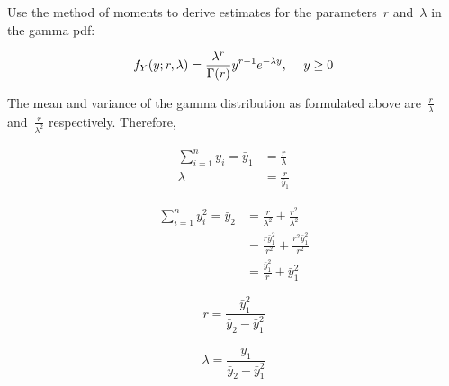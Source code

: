 \begin{problem}
   Use the method of moments to derive estimates for the parameters~$r$ and~$\lambda$ in the gamma pdf:

  \begin{equation}
    f_{Y}(y;r,\lambda) = \frac{\lambda^{r}}{\Gamma(r)} y^{r-1} e^{-\lambda y}\text{,} \hspace{0.5cm}y \geq 0
  \end{equation}
\end{problem}


The mean and variance of the gamma distribution as formulated above are~$\frac{r}{\lambda}$ and~$\frac{r}{\lambda^2}$ respectively.  Therefore,

\begin{align*}
  \sum_{i=1}^{n} y_i = \bar{y}_1 &= \frac{r}{\lambda} \\
                         \lambda &= \frac{r}{\bar{y}_{1}}
\end{align*}

\begin{align*}
  \sum_{i=1}^{n} y_{i}^{2} = \bar{y}_2  &= \frac{r}{\lambda^{2}} + \frac{r^2}{\lambda^2} \\
                                        &= \frac{r\bar{y}_{1}^2}{r^2} + \frac{r^2\bar{y}_{1}^2}{r^2} \\
                                        &= \frac{\bar{y}_{1}^2}{r} + \bar{y}_{1}^2
\end{align*}

\begin{equation}
  r = \boxed{\frac{\bar{y}_{1}^{2}}{\bar{y}_{2} - \bar{y}_{1}^{2}}}
\end{equation}

\begin{equation*}
  \lambda = \boxed{\frac{\bar{y}_{1}}{\bar{y}_{2} - \bar{y}_{1}^{2}}}
\end{equation*}
